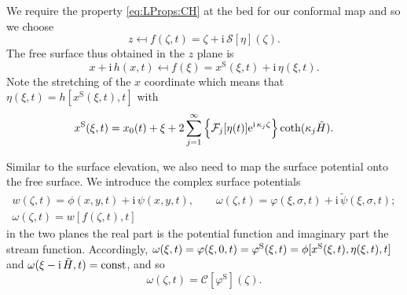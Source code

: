\documentclass[a4paper,12pt]{article}
\newcommand{\mr}{\mathrm}
\newcommand{\mc}{\mathcal}
\renewcommand{\S}{^\mr{S}}
\newcommand{\ii}{\mr{i}\,}
\newcommand{\ee}{\mr{e}}
\renewcommand{\_}[1]{_\mr{#1}}
\let\Re\relax
\let\Im\relax
\DeclareMathOperator\Re{Re}
\DeclareMathOperator\Im{Im}
\newcommand{\w}{w}
\newcommand{\z}{z}
\newcommand{\x}{x}
\newcommand{\y}{y}
\newcommand{\zz}{\zeta}
\newcommand{\xx}{\xi}
\newcommand{\yy}{\sigma}
\newcommand{\kk}{\kappa}
\newcommand{\zmap}{f}
\newcommand{\ww}{\omega}
\renewcommand{\w}{w}
\newcommand{\Hzz}{\tilde H}
\newcommand{\hzz}{\eta}
\newcommand{\hz}{h}
\newcommand{\Lsin}{\mc S}
\newcommand{\Lcos}{\mc C}
\newcommand{\FF}{\mc F}
\newcommand{\xS}{\x\S}
\begin{document}
We require the property \eqref{eq:LProps:CH} at the bed for our conformal map and so we choose
\begin{equation}
\z\mapsfrom \zmap(\zz,t) = \zz+\ii\Lsin[\hzz](\zz).
\label{eq:zmap}
\end{equation}
The free surface thus obtained in the $\z$ plane is
\[\x+\ii\hz(\x,t)\mapsfrom \zmap(\xx)=\xS(\xx,t)+\ii\hzz(\xx,t).\]
Note the stretching of the $\x$ coordinate which means that 
$\hzz(\xx,t) = \hz[\xS(\xx,t),t]$ with 
\[\xS(\xx,t)=\x_0(t)+\xx+2\sum_{j=1}^\infty \Im\Big\{\FF_j[\hzz(t)] \ee^{\ii \kk_j\zz}\Big\}\coth(\kk_j\Hzz).\] 


Similar to the surface elevation, we also need to map the surface potential onto the free surface.
We introduce the complex surface potentials 
\begin{gather*}
\w(\zz,t)=\phi(\x,\y,t)+\ii\psi(\x,\y,t),
\qquad
\ww(\zz,t)=\varphi(\xx,\yy,t)+\ii\tilde\psi(\xx,\yy,t);
\\
\ww(\zz,t)=\w[\zmap(\zz,t),t]
\end{gather*}
in the two planes
the real part is the potential function and imaginary part the stream function. 
Accordingly, 
$\Re \ww(\xx,t)=\varphi(\xx,0,t)=\varphi\S(\xx,t)=\phi[\xS(\xx,t),\hzz(\xx,t),t]$
 and $\Im \ww(\xx-\ii \Hzz,t)=\mr{const}$, and so
\begin{equation}
\ww(\zz,t) = \Lcos[\varphi\S](\zz).
\label{eq:ww}
\end{equation}
\end{document}
